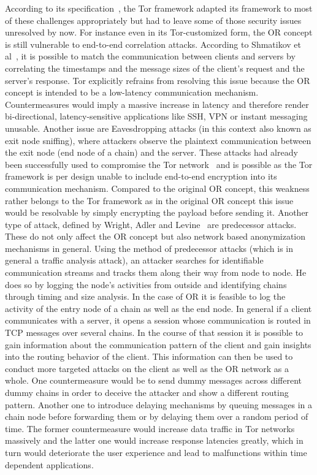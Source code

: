 \documentclass{sig-alternate}
\begin{document}
According to its specification~\cite{torspec}, the Tor framework adapted its framework to most of these challenges appropriately but had to leave some of those security issues unresolved by now. For instance even in its Tor-customized form, the OR concept is still vulnerable to end-to-end correlation attacks. According to Shmatikov et al~\cite{shmatikov2006timing}, it is possible to match the communication between clients and servers by correlating the timestamps and the message sizes of the client's request and the server's response. Tor explicitly refrains from resolving this issue because the OR concept is intended to be a low-latency communication mechanism. Countermeasures would imply a massive increase in latency and therefore render bi-directional, latency-sensitive applications like SSH, VPN or instant messaging unusable.
Another issue are Eavesdropping attacks (in this context also known as exit node sniffing), where attackers observe the plaintext communication between the exit node (end node of a chain) and the server. These attacks had already been successfully used to compromise the Tor network~\cite{eavesdrop} and is possible as the Tor framework is per design unable to include end-to-end encryption into its communication mechanism. Compared to the original OR concept, this weakness rather belongs to the Tor framework as in the original OR concept this issue would be resolvable by simply encrypting the payload before sending it.
Another type of attack, defined by Wright, Adler and Levine~\cite{wright2004predecessor} are predecessor attacks. These do not only affect the OR concept but also network based anonymization mechanisms in general. Using the method of predecessor attacks (which is in general a traffic analysis attack), an attacker searches for identifiable communication streams and tracks them along their way from node to node. He does so by logging the node's activities from outside and identifying chains through timing and size analysis. In the case of OR it is feasible to log the activity of the entry node of a chain as well as the end node. In general if a client communicates with a server, it opens a session whose communication is routed in TCP messages over several chains. In the course of that session it is possible to gain information about the communication pattern of the client and gain insights into the routing behavior of the client. This information can then be used to conduct more targeted attacks on the client as well as the OR network as a whole. One countermeasure would be to send dummy messages across different dummy chains in order to deceive the attacker and show a different routing pattern. Another one to introduce delaying mechanisms by queuing messages in a chain node before forwarding them or by delaying them over a random period of time. The former countermeasure would increase data traffic in Tor networks massively and the latter one would increase response latencies greatly, which in turn would deteriorate the user experience and lead to malfunctions within time dependent applications. 
\end{document}
